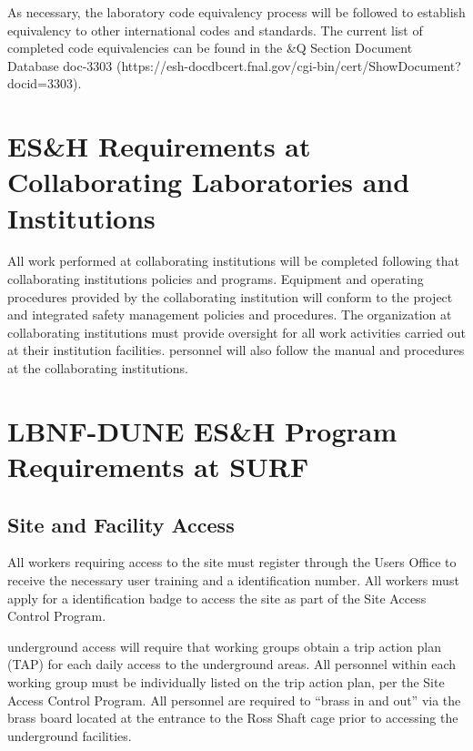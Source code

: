 As necessary, the laboratory code equivalency process will be followed
to establish equivalency to other international codes and
standards. The current list of completed code equivalencies can be
found in the \&Q Section Document Database doc-3303
(https://esh-docdbcert.fnal.gov/cgi-bin/cert/ShowDocument?docid=3303).


\section{ES\&H Requirements at Collaborating Laboratories and Institutions}

All work performed at collaborating institutions will be completed
following that collaborating institutions  policies and
programs. Equipment and operating procedures provided by the
collaborating institution will conform to the  project
 and integrated safety management policies and
procedures. The  organization at collaborating institutions
must provide  oversight for all work activities carried
out at their institution facilities. 
personnel will also follow the  manual and procedures at
the collaborating institutions.

\section{LBNF-DUNE ES\&H Program Requirements at SURF}

\subsection{Site and Facility Access}

All  workers requiring access to the  site must
register through the \fnal Users Office to receive the necessary user
training and a \fnal identification number. All workers must apply for
a  identification badge to access the  site as part of
the  Site Access Control Program.

 underground access will require that working groups
obtain a trip action plan (TAP) for each daily access to the
underground areas.  All personnel within each working group must be
individually listed on the trip action plan, per the  Site
Access Control Program. All personnel are required to ``brass in and
out'' via the brass board located at the entrance to the Ross Shaft
cage prior to accessing the underground facilities.


